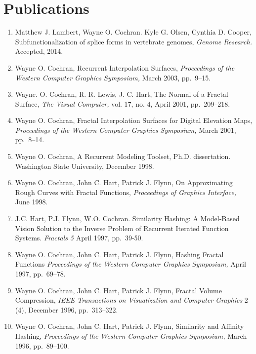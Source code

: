 \documentclass[10pt]{article}
\begin{document}
\section*{Publications}

\begin{enumerate}

\item Matthew J. Lambert, Wayne O. Cochran. Kyle G. Olsen, Cynthia D. Cooper,
  Subfunctionalization of splice forms in vertebrate genomes,
  {\em Genome Research.} Accepted, 2014.

\item Wayne O. Cochran,
Recurrent Interpolation Surfaces,
{\em Proceedings of the Western Computer Graphics Symposium,}
March 2003, pp.~9--15.

\item Wayne. O. Cochran, R. R. Lewis, J. C. Hart,
The Normal of a Fractal Surface,
{\em The Visual Computer,} vol. 17, no. 4, April 2001, pp.~209--218.

\item Wayne O. Cochran,
Fractal Interpolation Surfaces for Digital Elevation Maps,
{\em Proceedings of the Western Computer Graphics Symposium,}
March 2001, pp.~8--14.

\item Wayne O. Cochran,
A Recurrent Modeling Toolset, Ph.D. dissertation.
Washington State University, December 1998.

\item
Wayne O. Cochran, John C. Hart, Patrick J. Flynn,
On Approximating Rough Curves with Fractal Functions,
{\em Proceedings of Graphics Interface,}
June 1998.

\item
J.C. Hart, P.J. Flynn, W.O. Cochran. 
Similarity Hashing: A Model-Based Vision Solution to the Inverse 
Problem of Recurrent Iterated Function Systems. 
{\em Fractals 5} April 1997, pp.~39-50.

\item
Wayne O. Cochran, John C. Hart, Patrick J. Flynn,
Hashing Fractal Functions
{\em Proceedings of the Western Computer Graphics Symposium,}
April 1997, pp.~69--78.

\item
Wayne O. Cochran, John C. Hart, Patrick J. Flynn,
Fractal Volume Compression,
{\em IEEE Transactions on Visualization and Computer Graphics}
2 (4),
December 1996, pp.~313--322.

\item
Wayne O. Cochran, John C. Hart, Patrick J. Flynn,
Similarity and Affinity Hashing,
{\em Proceedings of the Western Computer Graphics Symposium,}
March 1996, pp.~89--100.


\end{enumerate}
\end{document}
